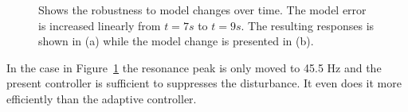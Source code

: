 \begin{figure}[h!]
  \centering %
  \qquad
  \caption{\label{fig:modelerror}Shows the robustness to model changes over time. The model error is increased linearly from $t=7s$ to $t=9s$. The resulting responses is shown in (a) while the model change is presented in (b).}
\end{figure}

In the case in Figure~\ref{fig:modelerror} the resonance peak is only moved to 45.5 Hz and the present controller is sufficient to suppresses the disturbance. It even does it more efficiently than the adaptive controller.

